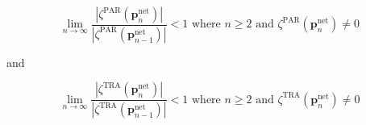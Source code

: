 \begin{equation}
	\lim_{n\to\infty} \frac{|\zeta^\text{PAR}(\textbf{p}^\text{net}_n)|}{|\zeta^\text{PAR}(\textbf{p}^\text{net}_{n-1})|} < 1 \text{ where } n \geq 2 \text{ and } \zeta^\text{PAR}(\textbf{p}^\text{net}_n) \neq 0
	\label{ch3:equ:convergence-criterion-par}
\end{equation}

and

\begin{equation}
	\lim_{n\to\infty} \frac{|\zeta^\text{TRA}(\textbf{p}^\text{net}_n)|}{|\zeta^\text{TRA}(\textbf{p}^\text{net}_{n-1})|} < 1 \text{ where } n \geq 2 \text{ and } \zeta^\text{TRA}(\textbf{p}^\text{net}_n) \neq 0
	\label{ch3:equ:convergence-criterion-tra}
\end{equation}